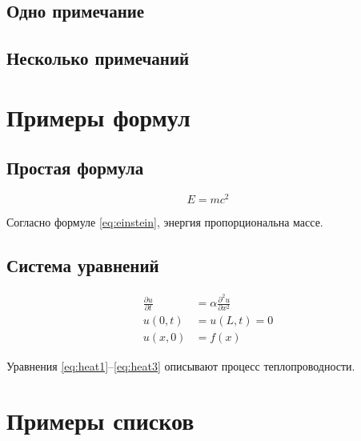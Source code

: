 \subsection{Одно примечание}


\subsection{Несколько примечаний}


\section{Примеры формул}

\subsection{Простая формула}

\begin{equation}
E = mc^2
\label{eq:einstein}
\end{equation}

Согласно формуле \ref{eq:einstein}, энергия пропорциональна массе.

\subsection{Система уравнений}

\begin{align}
\frac{\partial u}{\partial t} &= \alpha \frac{\partial^2 u}{\partial x^2} \label{eq:heat1} \\
u(0,t) &= u(L,t) = 0 \label{eq:heat2} \\
u(x,0) &= f(x) \label{eq:heat3}
\end{align}

Уравнения \ref{eq:heat1}--\ref{eq:heat3} описывают процесс теплопроводности.

\section{Примеры списков}

